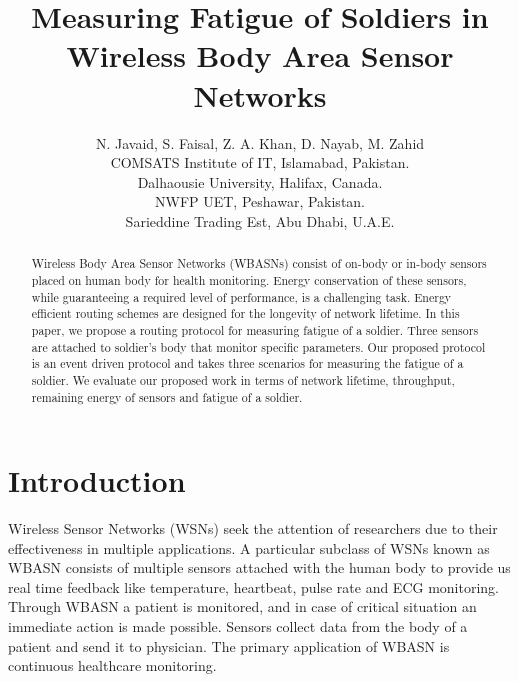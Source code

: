 \documentclass[journal]{IEEEtran}
\begin{document}
\title{Measuring Fatigue of Soldiers in\\ Wireless Body Area Sensor Networks}

\author{N. Javaid, S. Faisal, Z. A. Khan, D. Nayab, M. Zahid\\\vspace{0.4cm}
COMSATS Institute of IT, Islamabad, Pakistan.\\
        Dalhaousie University, Halifax, Canada.\\
        NWFP UET, Peshawar, Pakistan.\\
        Sarieddine Trading Est, Abu Dhabi, U.A.E.\\

     }

\maketitle

\begin{abstract}
Wireless Body Area Sensor Networks (WBASNs) consist of on-body or in-body sensors placed on human body for health monitoring. Energy conservation of these sensors,
while guaranteeing a required level of performance, is a challenging task. Energy efficient routing schemes are designed for the longevity of network lifetime.
In this paper, we propose a routing protocol for measuring fatigue of a soldier. Three sensors are attached to soldier's body that monitor specific parameters.
Our proposed protocol is an event driven protocol and takes three scenarios for measuring the fatigue of a soldier. We evaluate our proposed work in terms of
network lifetime, throughput, remaining energy of sensors and fatigue of a soldier.
\end{abstract}


\section{Introduction}
Wireless Sensor Networks (WSNs) seek the attention of researchers due to their effectiveness in multiple applications. A particular subclass of WSNs known as
WBASN consists of multiple sensors attached with the human body to provide us real time feedback like temperature, heartbeat, pulse rate and ECG monitoring.
Through WBASN a patient is monitored, and in case of critical situation an immediate action is made possible. Sensors collect data from the body of a patient
and send it to physician. The primary application of WBASN is continuous healthcare monitoring.
\end{document}
